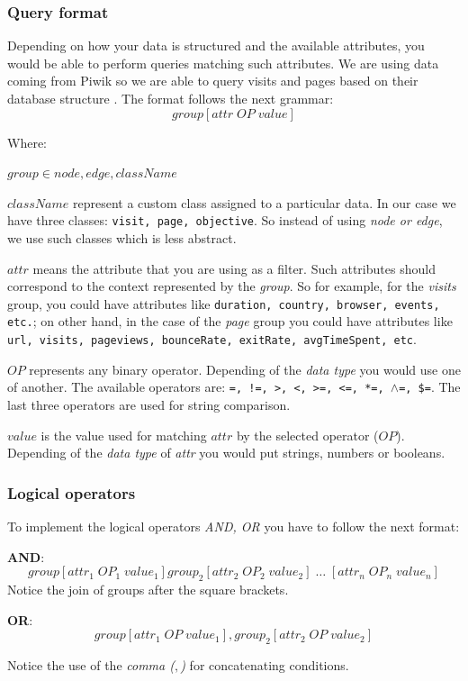 \documentclass[preprint,12pt,3p]{elsarticle}
\begin{document}
\subsubsection{Query format}
Depending on how your data is structured and the available attributes, you would be able to perform queries matching such attributes. We are using data coming from Piwik so we are able to query visits and pages based on their database structure \cite{}.
The format follows the next grammar:
\[
group[ attr \; OP \; value ]
\]

Where:

$ group \in node, edge, className $

$className$ represent a custom class assigned to a particular data. In our case we have three classes: \texttt{visit, page, objective}. So instead of using \textit{node or edge}, we use such classes which is less abstract.

$attr$ means the attribute that you are using as a filter. Such attributes should correspond to the context represented by the \textit{group}. So for example, for the \textit{visits} group, you could have attributes like \texttt{duration, country, browser, events, etc.}; on other hand, in the case of the \textit{page} group you could have attributes like \texttt{url, visits, pageviews, bounceRate, exitRate, avgTimeSpent, etc}.

$OP$ represents any binary operator. Depending of the \textit{data type} you would use one of another. The available operators are: \texttt{=, !=, >, <, >=, <=, *=, $\land$=, \$=}. The last three operators are used for string comparison.

$value$ is the value used for matching $attr$ by the selected operator ($OP$). Depending of the \textit{data type} of \textit{attr} you would put strings, numbers or booleans.

\subsubsection{Logical operators}
To implement the logical operators \textit{AND, OR} you have to follow the next format:

\textbf{AND}:
\[
group[attr_1 \; OP_1 \; value_1]group_2[attr_2 \; OP_2 \; value_2] \; \ldots \; [attr_n \; OP_n \; value_n]
\]
Notice the join of groups after the square brackets.

\textbf{OR}:
\[
group[attr_1 \; OP \; value_1],group_2[ attr_2 \; OP \; value_2]
\]

Notice the use of the \textit{comma ($,$)} for concatenating conditions.
\end{document}
